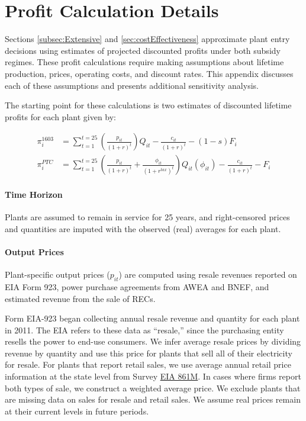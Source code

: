 \documentclass[12pt]{article}
\begin{document}
\clearpage
\section{Profit Calculation Details \label{Appendix:Profitability-calculation-detail}}

Sections \ref{subsec:Extensive} and \ref{sec:costEffectiveness} approximate plant entry decisions using estimates of projected discounted profits under both subsidy regimes. These profit calculations require making assumptions about lifetime production, prices, operating costs, and discount rates. This appendix discusses each of these assumptions and presents additional sensitivity analysis.

The starting point for these calculations is two estimates of discounted lifetime profits for each plant given by:

\begin{align*}
\pi_i^{1603}&=\sum_{t=1}^{t=25} \left(\frac{p_{it}}{(1+r)^{t}}\right) Q_{it} - \frac{c_{it}}{(1+r)^{t}} -(1-s)F_i \\
\pi_i^{PTC}&=\sum_{t=1}^{t=25}\left(\frac{p_{it}}{(1+r)^t} + \frac{\phi_{it}}{(1+r^{tax})^t} \right) Q_{it}(\phi_{it}) - \frac{c_{it}}{(1+r)^t} - F_i
\end{align*}

\paragraph*{Time Horizon}
Plants are assumed to remain in service for 25 years, and right-censored prices and quantities are imputed with the observed (real) averages for each plant.

\paragraph*{Output Prices}

Plant-specific output prices ($p_{it}$) are computed using resale revenues reported on EIA Form 923, power purchase agreements from AWEA and BNEF, and estimated revenue from the sale of RECs.

Form EIA-923 began collecting annual resale revenue and quantity for each plant in 2011. The EIA refers to these data as ``resale,'' since the purchasing entity resells the power to end-use consumers. We infer average resale prices by dividing revenue by quantity and use this price for plants that sell all of their electricity for resale. For plants that report retail sales, we use average annual retail price information at the state level from Survey \href{https://www.eia.gov/electricity/data/eia861m/index.html}{EIA 861M}. In cases where firms report both types of sale, we construct a weighted average price. We exclude plants that are missing data on sales for resale and retail sales. We assume real prices remain at their current levels in future periods.
\end{document}
